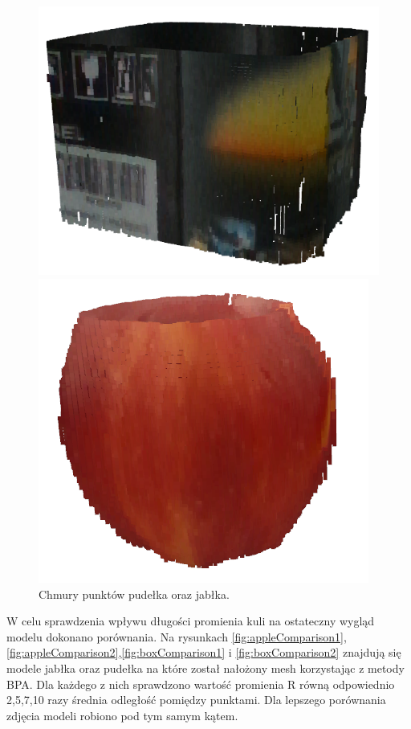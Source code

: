 \begin{figure}[H]
\centering
    \begin{minipage}[b]{0.45\linewidth}
        \includegraphics[scale=0.6]{pudelkoPointcloud.PNG}
    \end{minipage}
\quad
    \begin{minipage}[b]{0.45\linewidth}
        \includegraphics[scale=0.6]{jablkoPointcloud.PNG}

    \end{minipage}
\caption{Chmury punktów pudełka oraz jabłka.}
\label{fig:pointCloudFig}
\end{figure}

W celu sprawdzenia wpływu długości promienia kuli na ostateczny wygląd modelu dokonano porównania. Na rysunkach \ref{fig:appleComparison1},\ref{fig:appleComparison2},\ref{fig:boxComparison1} i \ref{fig:boxComparison2} znajdują się modele jabłka oraz pudełka na które został nałożony mesh korzystając z metody BPA. Dla każdego z nich sprawdzono wartość promienia R równą odpowiednio 2,5,7,10 razy średnia odległość pomiędzy punktami. Dla lepszego porównania zdjęcia modeli robiono pod tym samym kątem.



